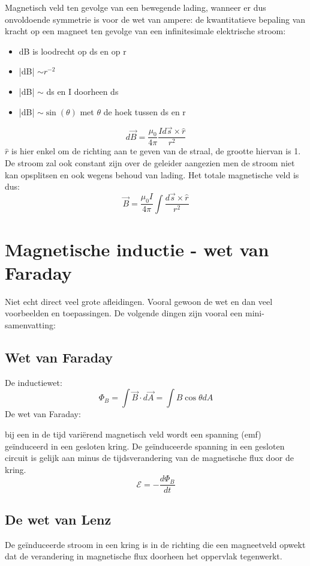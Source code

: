 \documentclass[12pt,a4paper]{article}
\begin{document}
    Magnetisch veld ten gevolge van een bewegende lading, wanneer er dus onvoldoende symmetrie is voor de wet van ampere: 
    de kwantitatieve bepaling van kracht op een magneet ten gevolge van een infinitesimale elektrische stroom: 
    \begin{itemize}
    	\renewcommand\labelitemi{--}
    	\item dB is loodrecht op ds en op r
    	\item |dB| $\sim r^{-2}$
    	\item |dB| $\sim$ ds en I doorheen ds
    	\item |dB| $\sim \sin(\theta)$ met $\theta$ de hoek tussen ds en r
    \end{itemize}
	\[d\vec{B} = \frac{\mu_0}{4\pi}\frac{Id\vec{s}\times\hat{r}}{r^2}\]
	$\hat{r}$ is hier enkel om de richting aan te geven van de straal, de grootte hiervan is 1. De stroom zal ook constant zijn over de geleider aangezien men de stroom niet kan opsplitsen en ook wegens behoud van lading.
	Het totale magnetische veld is dus: 
	\[\vec{B} = \frac{\mu_0I}{4\pi}\int\frac{d\vec{s}\times\hat{r}}{r^2}\]
    
    \section{Magnetische inductie - wet van Faraday}
    Niet echt direct veel grote afleidingen. Vooral gewoon de wet en dan veel voorbeelden en toepassingen. De volgende dingen zijn vooral een mini-samenvatting:
    \subsection{Wet van Faraday}
    De inductiewet: \[\Phi_B = \int\vec{B}\cdot d\vec{A} = \int B\cos\theta dA\]
    De wet van Faraday: 
    
    bij een in de tijd variërend magnetisch veld wordt een spanning (emf) geïnduceerd in een gesloten kring. De geïnduceerde spanning in een gesloten circuit is gelijk aan minus de tijdsverandering van de magnetische flux door de kring. \[\mathcal{E} = -\frac{d\Phi_B}{dt}\]
    
    \subsection{De wet van Lenz}
    De geïnduceerde stroom in een kring is in de richting die een magneetveld opwekt dat de verandering in magnetische flux doorheen het oppervlak tegenwerkt. 
    
\end{document}

